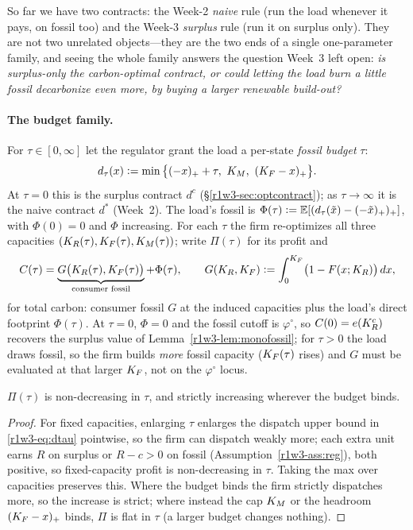 So far we have two contracts: the Week-2 \emph{naive} rule (run the load whenever it
pays, on fossil too) and the Week-3 \emph{surplus} rule (run it on surplus only). They
are not two unrelated objects---they are the two ends of a single one-parameter family,
and seeing the whole family answers the question Week~3 left open: \emph{is surplus-only
the carbon-optimal contract, or could letting the load burn a little fossil decarbonize
even more, by buying a larger renewable build-out?}

\paragraph{The budget family.} For $\tau\in[0,\infty]$ let the regulator grant the load
a per-state \emph{fossil budget} $\tau$:
\begin{equation}\label{r1w3-eq:dtau}
  d_{\tau}(x)\eqdef\min\big\{(-x)_+ + \tau,\ \KM,\ (\KF-x)_+\big\}.
\end{equation}
At $\tau=0$ this is the surplus contract $d^{c}$ (\S\ref{r1w3-sec:optcontract}); as
$\tau\to\infty$ it is the naive contract $d^{*}$ (Week~2). The load's fossil is
$\Phi(\tau)\vcentcolon=\mathbb{E}[(d_{\tau}(\tilde x)-(-\tilde x)_+)_+]$, with $\Phi(0)=0$ and $\Phi$
increasing. For each $\tau$ the firm re-optimizes all three capacities
$(K_R(\tau),K_F(\tau),K_M(\tau))$; write $\Pi(\tau)$ for its profit and
\begin{equation}\label{r1w3-eq:Ctau}
  C(\tau)=\underbrace{G\big(K_R(\tau),K_F(\tau)\big)}_{\text{consumer fossil}}+\Phi(\tau),
  \qquad G(K_R,K_F)\vcentcolon=\int_0^{K_F}\!\big(1-F(x;K_R)\big)\,dx ,
\end{equation}
for total carbon: consumer fossil $G$ at the induced capacities plus the load's direct
footprint $\Phi(\tau)$. At $\tau=0$, $\Phi=0$ and the fossil cutoff is $\varphi^{\circ}$,
so $C(0)=e(K_R^{c})$ recovers the surplus value of Lemma~\ref{r1w3-lem:monofossil}; for $\tau>0$
the load draws fossil, so the firm builds \emph{more} fossil capacity ($K_F(\tau)$ rises)
and $G$ must be evaluated at that larger $K_F$, not on the $\varphi^{\circ}$ locus.

\begin{proposition}\label{r1w3-prop:profitmono}
$\Pi(\tau)$ is non-decreasing in $\tau$, and strictly increasing wherever the budget
binds.
\end{proposition}
\begin{proof}
For fixed capacities, enlarging $\tau$ enlarges the dispatch upper bound in
\eqref{r1w3-eq:dtau} pointwise, so the firm can dispatch weakly more; each extra unit earns
$R$ on surplus or $R-c>0$ on fossil (Assumption~\ref{r1w3-ass:reg}), both positive, so
fixed-capacity profit is non-decreasing in $\tau$. Taking the max over capacities
preserves this. Where the budget binds the firm strictly dispatches more, so the
increase is strict; where instead the cap $K_M$ or the headroom $(K_F-x)_+$ binds, $\Pi$
is flat in $\tau$ (a larger budget changes nothing).
\end{proof}


